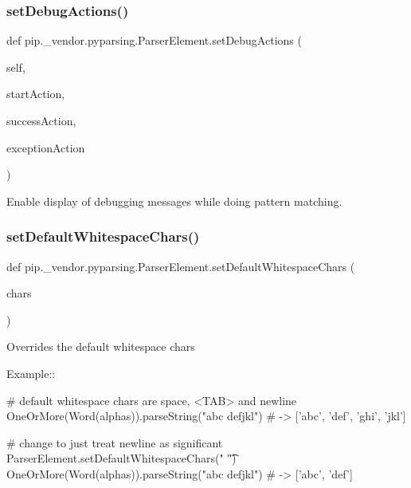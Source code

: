 \subsubsection{\texorpdfstring{set\+Debug\+Actions()}{setDebugActions()}}
{\footnotesize\ttfamily def pip.\+\_\+vendor.\+pyparsing.\+Parser\+Element.\+set\+Debug\+Actions (\begin{DoxyParamCaption}\item[{}]{self,  }\item[{}]{start\+Action,  }\item[{}]{success\+Action,  }\item[{}]{exception\+Action }\end{DoxyParamCaption})}

\begin{DoxyVerb}Enable display of debugging messages while doing pattern matching.
\end{DoxyVerb}
 \mbox{\label{classpip_1_1__vendor_1_1pyparsing_1_1ParserElement_a5979c2ba590325f51c5f4096a39a4a50}} 
\subsubsection{\texorpdfstring{set\+Default\+Whitespace\+Chars()}{setDefaultWhitespaceChars()}}
{\footnotesize\ttfamily def pip.\+\_\+vendor.\+pyparsing.\+Parser\+Element.\+set\+Default\+Whitespace\+Chars (\begin{DoxyParamCaption}\item[{}]{chars }\end{DoxyParamCaption})\hspace{0.3cm}{\ttfamily [static]}}

\begin{DoxyVerb}Overrides the default whitespace chars

Example::

    # default whitespace chars are space, <TAB> and newline
    OneOrMore(Word(alphas)).parseString("abc def\nghi jkl")  # -> ['abc', 'def', 'ghi', 'jkl']

    # change to just treat newline as significant
    ParserElement.setDefaultWhitespaceChars(" \t")
    OneOrMore(Word(alphas)).parseString("abc def\nghi jkl")  # -> ['abc', 'def']
\end{DoxyVerb}
 \mbox{\label{classpip_1_1__vendor_1_1pyparsing_1_1ParserElement_aa62d86fd6bd6479e74f0af4e743612a3}} 
